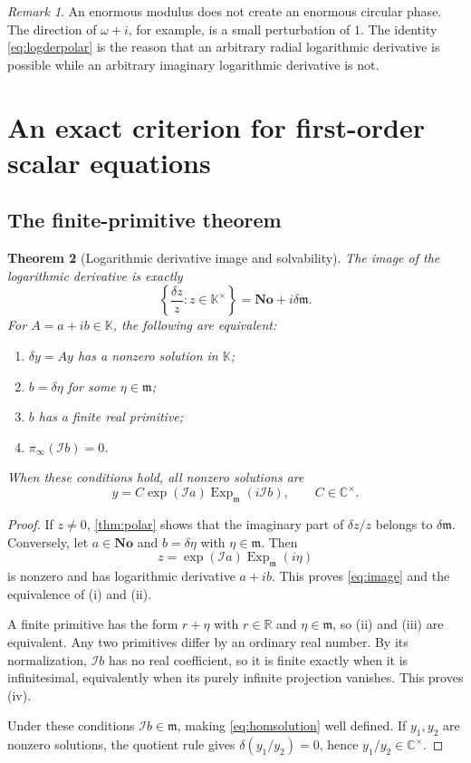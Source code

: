 \documentclass[11pt,letterpaper]{article}
\numberwithin{equation}{section}
\newtheorem{theorem}{Theorem}[section]
\theoremstyle{definition}
\theoremstyle{remark}
\newtheorem{remark}[theorem]{Remark}
\newcommand{\No}{\mathbf{No}}
\newcommand{\K}{\mathbb K}
\newcommand{\R}{\mathbb R}
\newcommand{\C}{\mathbb C}
\newcommand{\mm}{\mathfrak m}
\newcommand{\Ex}{\operatorname{Exp}_{\mm}}
\newcommand{\Iop}{\mathcal I}
\begin{document}
\begin{remark}
An enormous modulus does not create an enormous circular phase. The direction of $\omega+i$, for example, is a small perturbation of $1$. The identity \eqref{eq:logderpolar} is the reason that an arbitrary radial logarithmic derivative is possible while an arbitrary imaginary logarithmic derivative is not.
\end{remark}

\section{An exact criterion for first-order scalar equations}\label{sec:firstorder}

\subsection{The finite-primitive theorem}
\begin{theorem}[Logarithmic derivative image and solvability]\label{thm:phasecriterion}
The image of the logarithmic derivative is exactly
\begin{equation}\label{eq:image}
 \left\{\frac{\delta z}{z}:z\in\K^\times\right\}
   =\No+i\delta\mm.
\end{equation}
For $A=a+ib\in\K$, the following are equivalent:
\begin{enumerate}[label=(\roman*)]
\item $\delta y=Ay$ has a nonzero solution in $\K$;
\item $b=\delta\eta$ for some $\eta\in\mm$;
\item $b$ has a finite real primitive;
\item $\pi_\infty(\Iop b)=0$.
\end{enumerate}
When these conditions hold, all nonzero solutions are
\begin{equation}\label{eq:homsolution}
 y=C\exp(\Iop a)\Ex(i\Iop b),\qquad C\in\C^\times.
\end{equation}
\end{theorem}
\begin{proof}
If $z\ne0$, \cref{thm:polar} shows that the imaginary part of $\delta z/z$ belongs to $\delta\mm$. Conversely, let $a\in\No$ and $b=\delta\eta$ with $\eta\in\mm$. Then
\[
 z=\exp(\Iop a)\Ex(i\eta)
\]
is nonzero and has logarithmic derivative $a+ib$. This proves \eqref{eq:image} and the equivalence of (i) and (ii).

A finite primitive has the form $r+\eta$ with $r\in\R$ and $\eta\in\mm$, so (ii) and (iii) are equivalent. Any two primitives differ by an ordinary real number. By its normalization, $\Iop b$ has no real coefficient, so it is finite exactly when it is infinitesimal, equivalently when its purely infinite projection vanishes. This proves (iv).

Under these conditions $\Iop b\in\mm$, making \eqref{eq:homsolution} well defined. If $y_1,y_2$ are nonzero solutions, the quotient rule gives $\delta(y_1/y_2)=0$, hence $y_1/y_2\in\C^\times$.
\end{proof}
\end{document}
